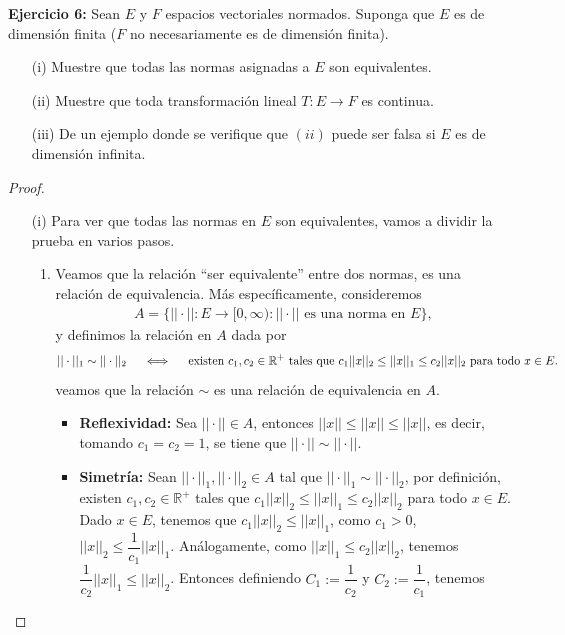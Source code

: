 
\textbf{Ejercicio 6:} Sean $E$ y $F$ espacios vectoriales normados. Suponga que $E$ es de dimensión finita ($F$ no necesariamente es de dimensión finita).
\begin{itemize}
    \item[(i)] Muestre que todas las normas asignadas a $E$ son equivalentes.
    \item[(ii)] Muestre que toda transformación lineal $T:E\to F$ es continua.
    \item[(iii)] De un ejemplo donde se verifique que $(ii)$ puede ser falsa si $E$ es de dimensión infinita.
\end{itemize}
\begin{proof}
    \begin{enumerate}
        \item[(i)] Para ver que todas las normas en $E$ son equivalentes, vamos a dividir la prueba en varios pasos.
        \begin{enumerate}
            \item Veamos que la relación ``ser equivalente'' entre dos normas, es una relación de equivalencia. Más específicamente, consideremos 
            \begin{align*}
                A=\{||\cdot||:E\to [0,\infty):||\cdot|| \text{ es una norma en } E\},
            \end{align*}
            y definimos la relación en $A$ dada por 
                \begin{align*}
                    ||\cdot||_1 \sim ||\cdot||_2 \hspace{5mm} \Longleftrightarrow \hspace{5mm} \text{existen } c_1,c_2\in \mathbb{R}^+ \text{ tales que } c_1||x||_2\leq ||x||_1\leq c_2||x||_2 \text{ para todo } x \in E.
                \end{align*}
                veamos que la relación $\sim$ es una relación de equivalencia en $A$.
                \begin{itemize}
                    \item \textbf{Reflexividad:} Sea $||\cdot||\in A$, entonces $||x||\leq ||x||\leq ||x||$, es decir, tomando $c_1=c_2=1$, se tiene que $||\cdot||\sim ||\cdot||$.
                    \item \textbf{Simetría:} Sean $||\cdot||_1, ||\cdot||_2 \in A$ tal que $||\cdot||_1\sim ||\cdot||_2$, por definición, existen $c_1,c_2 \in \mathbb{R}^+$ tales que $c_1||x||_2\leq ||x||_1\leq c_2||x||_2$ para todo $x \in E$. Dado $x \in E$, tenemos que $c_1||x||_2\leq ||x||_1$, como $c_1>0$, $||x||_2\leq \dfrac{1}{c_1}||x||_1$. Análogamente, como $||x||_1\leq c_2||x||_2$, tenemos $\dfrac{1}{c_2}||x||_1\leq ||x||_2$. Entonces definiendo $C_1:=\dfrac{1}{c_2}$ y $C_2:=\dfrac{1}{c_1}$, tenemos

\end{itemize}
\end{enumerate}
\end{enumerate}
\end{proof}

